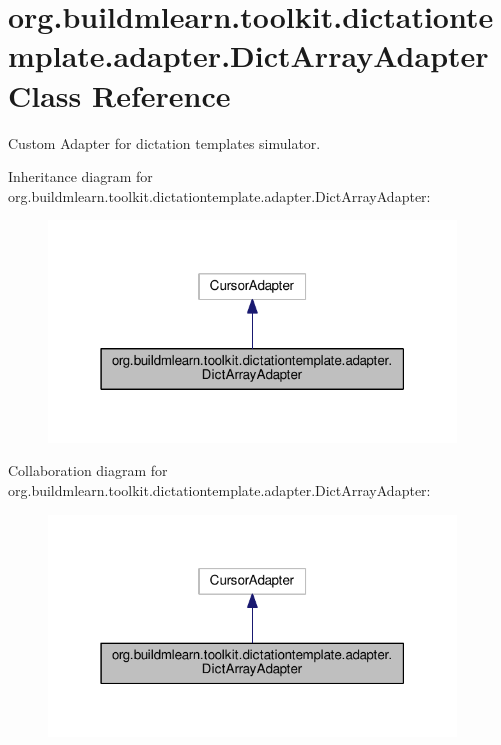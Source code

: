 \hypertarget{classorg_1_1buildmlearn_1_1toolkit_1_1dictationtemplate_1_1adapter_1_1DictArrayAdapter}{}\section{org.\+buildmlearn.\+toolkit.\+dictationtemplate.\+adapter.\+Dict\+Array\+Adapter Class Reference}
\label{classorg_1_1buildmlearn_1_1toolkit_1_1dictationtemplate_1_1adapter_1_1DictArrayAdapter}


Custom Adapter for dictation template\textquotesingle{}s simulator.  




Inheritance diagram for org.\+buildmlearn.\+toolkit.\+dictationtemplate.\+adapter.\+Dict\+Array\+Adapter\+:
\nopagebreak
\begin{figure}[H]
\begin{center}
\leavevmode
\includegraphics[width=307pt]{classorg_1_1buildmlearn_1_1toolkit_1_1dictationtemplate_1_1adapter_1_1DictArrayAdapter__inherit__graph}
\end{center}
\end{figure}


Collaboration diagram for org.\+buildmlearn.\+toolkit.\+dictationtemplate.\+adapter.\+Dict\+Array\+Adapter\+:
\nopagebreak
\begin{figure}[H]
\begin{center}
\leavevmode
\includegraphics[width=307pt]{classorg_1_1buildmlearn_1_1toolkit_1_1dictationtemplate_1_1adapter_1_1DictArrayAdapter__coll__graph}
\end{center}
\end{figure}
